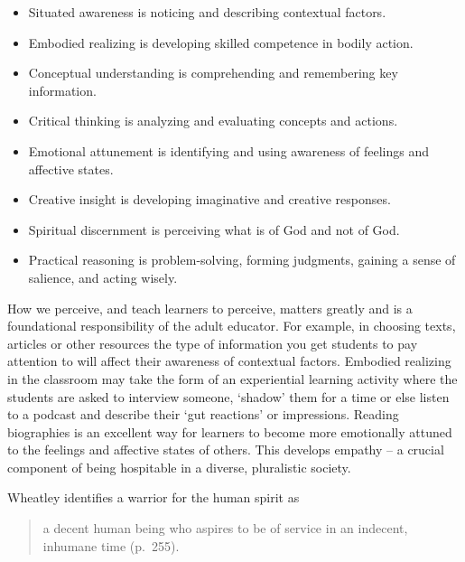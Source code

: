 \documentclass[
]{book}
\providecommand{\tightlist}{%
  \setlength{\itemsep}{0pt}\setlength{\parskip}{0pt}}
\begin{document}
\begin{itemize}
\tightlist
\item
  Situated awareness is noticing and describing contextual factors.\\
\item
  Embodied realizing is developing skilled competence in bodily action.\\
\item
  Conceptual understanding is comprehending and remembering key information.\\
\item
  Critical thinking is analyzing and evaluating concepts and actions.\\
\item
  Emotional attunement is identifying and using awareness of feelings and affective states.\\
\item
  Creative insight is developing imaginative and creative responses.\\
\item
  Spiritual discernment is perceiving what is of God and not of God.\\
\item
  Practical reasoning is problem-solving, forming judgments, gaining a sense of salience, and acting wisely.
\end{itemize}

How we perceive, and teach learners to perceive, matters greatly and is a foundational responsibility of the adult educator. For example, in choosing texts, articles or other resources the type of information you get students to pay attention to will affect their awareness of contextual factors. Embodied realizing in the classroom may take the form of an experiential learning activity where the students are asked to interview someone, `shadow' them for a time or else listen to a podcast and describe their `gut reactions' or impressions. Reading biographies is an excellent way for learners to become more emotionally attuned to the feelings and affective states of others. This develops empathy -- a crucial component of being hospitable in a diverse, pluralistic society.

Wheatley identifies a warrior for the human spirit as

\begin{quote}
a decent human being who aspires to be of service in an indecent, inhumane time (p.~255).
\end{quote}
\end{document}
